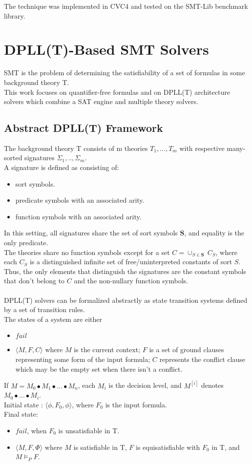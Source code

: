 \documentclass{article}
\begin{document}
The technique was implemented in CVC4 and tested on the SMT-Lib
benchmark library.

\section{DPLL(T)-Based SMT Solvers}
SMT is the problem of determining the satisfiability of a 
set of formulas in some background theory T. \\
This work focuses on quantifier-free formulas and on 
DPLL(T) architecture solvers which combine a SAT engine and 
multiple theory solvers.

\subsection{Abstract DPLL(T) Framework}
The background theory T consists of m theories $T_1,...,T_m$
with respective many-sorted signatures $\Sigma_1,..,\Sigma_m$. \\
A signature is defined as consisting of:
\begin{itemize}
	\item sort symbols.
	\item predicate symbols with an associated arity.
	\item function symbols with an associated arity.
\end{itemize}

In this setting, all signatures share the set of sort symbols 
$\textbf{S}$, and equality is the only predicate. \\
The theories share no function symbols except for a set 
$C = \cup_{S \in \textbf{S}}\ C_S$, where each $C_S$ is a 
distinguished infinite set of free/uninterpreted constants
of sort $S$. Thus, the only elements that distinguish the 
signatures are the constant symbols that don't belong to 
$C$ and the non-nullary function symbols. \\ \\
DPLL(T) solvers can be formalized abstractly as 
state transition systems defined by a set of transition rules.\\
The states of a system are either
\begin{itemize}
	\item $fail$
	\item $\langle M, F, C \rangle$
	where $M$ is the current context; $F$ is a set of ground clauses
	representing some form of the input formula; $C$ represents the
	conflict clause which may be the empty set when there isn't
	a conflict.
\end{itemize}
If $M = M_0 \bullet M_1 \bullet ... \bullet M_n$, each $M_i$ is the
decision level, and $M^{[i]}$ denotes $M_0 \bullet ... \bullet M_i$. \\
Initial state : $\langle \phi, F_0, \phi \rangle$, where $F_0$ is 
the input formula. \\
Final state:
\begin{itemize}
	\item $fail$, when $F_0$ is unsatisfiable in T.
	\item $\langle M, F, \Phi \rangle$ where $M$ is satisfiable in
	T, $F$ is equisatisfiable with $F_0$ in T, and $M \models_P F$.
\end{itemize}
\end{document}
